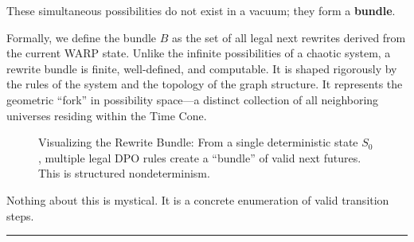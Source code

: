 These simultaneous possibilities do not exist in a vacuum; they form a \textbf{bundle}.

Formally, we define the bundle $B$ as the set of all legal next rewrites derived from the current WARP state. Unlike the infinite possibilities of a chaotic system, a rewrite bundle is finite, well-defined, and computable. It is shaped rigorously by the rules of the system and the topology of the graph structure. It represents the geometric ``fork'' in possibility space—a distinct collection of all neighboring universes residing within the Time Cone.

\begin{figure}[h]
\centering
{}
\caption{Visualizing the Rewrite Bundle: From a single deterministic state $S_0$, multiple legal DPO rules create a ``bundle'' of valid next futures. This is structured nondeterminism.}
\end{figure}

Nothing about this is mystical. It is a concrete enumeration of valid transition steps.

\begin{center}\rule{0.5\linewidth}{0.5pt}\end{center}

